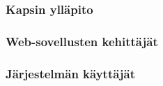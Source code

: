 

\subsubsection{Kapsin ylläpito}


\subsubsection{Web-sovellusten kehittäjät}


\subsubsection{Järjestelmän käyttäjät}
